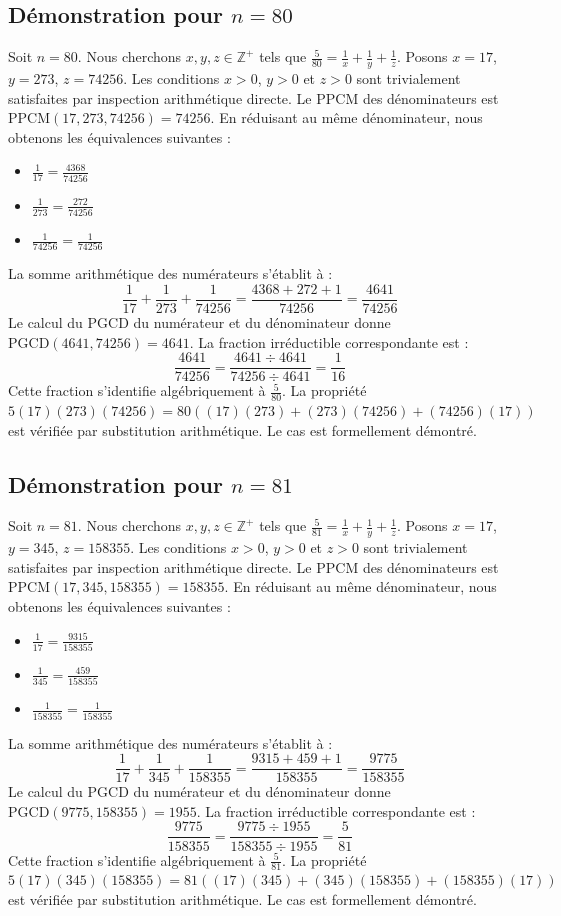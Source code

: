 \documentclass[12pt,a4paper]{article}
\begin{document}
\subsection{Démonstration pour $n = 80$}
Soit $n = 80$. Nous cherchons $x, y, z \in \mathbb{Z}^{+}$ tels que $\frac{5}{80} = \frac{1}{x} + \frac{1}{y} + \frac{1}{z}$.
Posons $x = 17$, $y = 273$, $z = 74256$.
Les conditions $x > 0$, $y > 0$ et $z > 0$ sont trivialement satisfaites par inspection arithmétique directe.
Le PPCM des dénominateurs est $\text{PPCM}(17, 273, 74256) = 74256$.
En réduisant au même dénominateur, nous obtenons les équivalences suivantes :
\begin{itemize}
    \item $\frac{1}{17} = \frac{4368}{74256}$
    \item $\frac{1}{273} = \frac{272}{74256}$
    \item $\frac{1}{74256} = \frac{1}{74256}$
\end{itemize}
La somme arithmétique des numérateurs s'établit à :
$$ \frac{1}{17} + \frac{1}{273} + \frac{1}{74256} = \frac{4368 + 272 + 1}{74256} = \frac{4641}{74256} $$
Le calcul du PGCD du numérateur et du dénominateur donne $\text{PGCD}(4641, 74256) = 4641$.
La fraction irréductible correspondante est :
$$ \frac{4641}{74256} = \frac{4641 \div 4641}{74256 \div 4641} = \frac{1}{16} $$
Cette fraction s'identifie algébriquement à $\frac{5}{80}$.
La propriété $5(17)(273)(74256) = 80((17)(273) + (273)(74256) + (74256)(17))$ est vérifiée par substitution arithmétique.
Le cas est formellement démontré.

\subsection{Démonstration pour $n = 81$}
Soit $n = 81$. Nous cherchons $x, y, z \in \mathbb{Z}^{+}$ tels que $\frac{5}{81} = \frac{1}{x} + \frac{1}{y} + \frac{1}{z}$.
Posons $x = 17$, $y = 345$, $z = 158355$.
Les conditions $x > 0$, $y > 0$ et $z > 0$ sont trivialement satisfaites par inspection arithmétique directe.
Le PPCM des dénominateurs est $\text{PPCM}(17, 345, 158355) = 158355$.
En réduisant au même dénominateur, nous obtenons les équivalences suivantes :
\begin{itemize}
    \item $\frac{1}{17} = \frac{9315}{158355}$
    \item $\frac{1}{345} = \frac{459}{158355}$
    \item $\frac{1}{158355} = \frac{1}{158355}$
\end{itemize}
La somme arithmétique des numérateurs s'établit à :
$$ \frac{1}{17} + \frac{1}{345} + \frac{1}{158355} = \frac{9315 + 459 + 1}{158355} = \frac{9775}{158355} $$
Le calcul du PGCD du numérateur et du dénominateur donne $\text{PGCD}(9775, 158355) = 1955$.
La fraction irréductible correspondante est :
$$ \frac{9775}{158355} = \frac{9775 \div 1955}{158355 \div 1955} = \frac{5}{81} $$
Cette fraction s'identifie algébriquement à $\frac{5}{81}$.
La propriété $5(17)(345)(158355) = 81((17)(345) + (345)(158355) + (158355)(17))$ est vérifiée par substitution arithmétique.
Le cas est formellement démontré.
\end{document}
